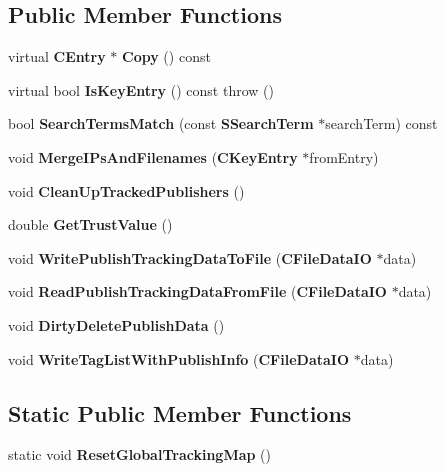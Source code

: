 \subsection*{Public Member Functions}
\begin{DoxyCompactItemize}
\item 
virtual {\bf CEntry} $\ast$ {\bfseries Copy} () const \label{classKademlia_1_1CKeyEntry_a1d283ddd8a20b343cbc72e57157dbb71}

\item 
virtual bool {\bfseries IsKeyEntry} () const   throw ()\label{classKademlia_1_1CKeyEntry_a7d586355bf69bee2c27266bb99dfb14e}

\item 
bool {\bfseries SearchTermsMatch} (const {\bf SSearchTerm} $\ast$searchTerm) const \label{classKademlia_1_1CKeyEntry_a9b171d7d628e8cc30a5b48ed17cb5b94}

\item 
void {\bfseries MergeIPsAndFilenames} ({\bf CKeyEntry} $\ast$fromEntry)\label{classKademlia_1_1CKeyEntry_a2f2dd231eb996f870fa68d141a266f0d}

\item 
void {\bfseries CleanUpTrackedPublishers} ()\label{classKademlia_1_1CKeyEntry_a83b97b976db657a888f4e3292838b2e8}

\item 
double {\bfseries GetTrustValue} ()\label{classKademlia_1_1CKeyEntry_a9560b486ef5e726dea1206b43a5c38bf}

\item 
void {\bfseries WritePublishTrackingDataToFile} ({\bf CFileDataIO} $\ast$data)\label{classKademlia_1_1CKeyEntry_a4c1835bc4da4702c742233eab173741e}

\item 
void {\bfseries ReadPublishTrackingDataFromFile} ({\bf CFileDataIO} $\ast$data)\label{classKademlia_1_1CKeyEntry_a86d630fdc9152634e8606336168d8fc4}

\item 
void {\bfseries DirtyDeletePublishData} ()\label{classKademlia_1_1CKeyEntry_a225a153c0c5a1333ee14bcdc669fa2f0}

\item 
void {\bfseries WriteTagListWithPublishInfo} ({\bf CFileDataIO} $\ast$data)\label{classKademlia_1_1CKeyEntry_a66ad04ed348ebf6d4934660a2581795b}

\end{DoxyCompactItemize}
\subsection*{Static Public Member Functions}
\begin{DoxyCompactItemize}
\item 
static void {\bfseries ResetGlobalTrackingMap} ()\label{classKademlia_1_1CKeyEntry_a705a72aafb66a6b093df1d0745eb877c}

\end{DoxyCompactItemize}
